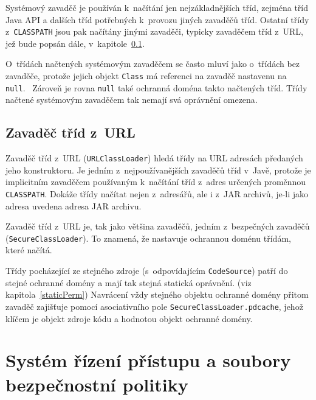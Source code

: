 Systémový zavaděč je používán k~načítání jen nejzákladnějších tříd, zejména tříd Java API a dalších tříd potřebných k~provozu jiných zavaděčů tříd.
Ostatní třídy z~{\tt CLASSPATH} jsou pak načítány jinými zavaděči, typicky zavaděčem tříd z~URL, jež bude popsán dále, v~kapitole~\ref{URLClassLoader}.

O~třídách načtených systémovým zavaděčem se často mluví jako o~třídách bez zavaděče, protože jejich objekt {\tt Class} má referenci na zavaděč nastavenu na {\tt null}.~\cite{oaks} Zároveň je rovna {\tt null} také ochranná doména takto načtených tříd. Třídy načtené systémovým zavaděčem tak nemají svá oprávnění omezena.~\cite{oaks}

\subsection{Zavaděč tříd z~URL} \label{URLClassLoader}

Zavaděč tříd z~URL ({\tt URLClassLoader}) hledá třídy na URL adresách předaných jeho konstruktoru. Je jedním z~nejpoužívanějších zavaděčů tříd v~Javě,
protože je implicitním zavaděčem používaným k~načítání tříd z~adres určených proměnnou {\tt CLASSPATH}.
Dokáže třídy načítat nejen z~adresářů, ale i z~JAR archivů, je-li jako adresa uvedena adresa JAR archivu.~\cite{oaks}

Zavaděč tříd z~URL je, tak jako většina zavaděčů, jedním z~bezpečných zavaděčů ({\tt SecureClassLoader}).
To znamená, že nastavuje ochrannou doménu třídám, které načítá.

Třídy pocházející ze stejného zdroje (s~odpovídajícím {\tt CodeSource}) patří do stejné ochranné domény a mají tak stejná statická oprávnění.
(viz kapitola~\ref{staticPerm})
Navrácení vždy stejného objektu ochranné domény přitom zavaděč zajišťuje pomocí asociativního pole {\tt SecureClassLoader.pdcache},
jehož klíčem je objekt zdroje kódu a hodnotou objekt ochranné domény.
\cite{sourceSecureClassLoader}

\section{Systém řízení přístupu a soubory bezpečnostní politiky}

